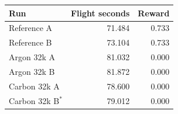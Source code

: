 \begin{tabular}{@{}lrr@{}}
\toprule
Run & Flight seconds & Reward \\
\midrule
Reference A & 71.484 & 0.733 \\
Reference B & 73.104 & 0.733 \\
Argon 32k A & 81.032 & 0.000 \\
Argon 32k B & 81.872 & 0.000 \\
Carbon 32k A & 78.600 & 0.000 \\
Carbon 32k B$^*$ & 79.012 & 0.000 \\
\bottomrule
\end{tabular}
